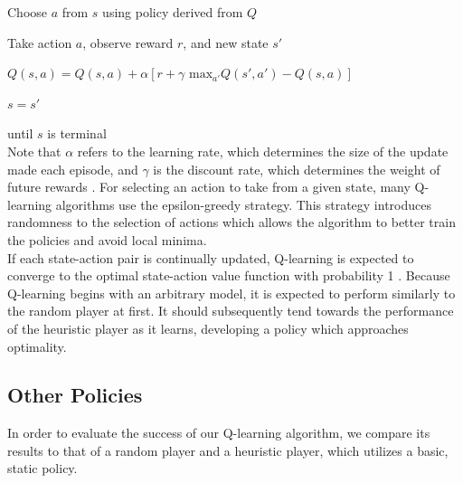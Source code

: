         Choose $a$ from $s$ using policy derived from $Q$ \
        
        Take action $a$, observe reward $r$, and new state $s'$ \
        
        $Q(s,a) = Q(s,a) + \alpha[r + \gamma \text{ max}_{a'} Q(s',a') - Q(s,a)]$ \
        
        $s = s'$ \
        
    \noindent until $s$ is terminal \\

\noindent Note that $\alpha$ refers to the learning rate, which determines the size of the update made each episode, and $\gamma$ is the discount rate, which determines the weight of future rewards \cite{q}. For selecting an action to take from a given state, many Q-learning algorithms use the epsilon-greedy strategy. This strategy introduces randomness to the selection of actions which allows the algorithm to better train the policies and avoid local minima. \\

\noindent If each state-action pair is continually updated, Q-learning is expected to converge to the optimal state-action value function with probability 1 \cite{q}. Because Q-learning begins with an arbitrary model, it is expected to perform similarly to the random player at first. It should subsequently tend towards the performance of the heuristic player as it learns, developing a policy which approaches optimality. 


\subsection{Other Policies}
In order to evaluate the success of our Q-learning algorithm, we compare its results to that of a random player and a heuristic player, which utilizes a basic, static policy. 

